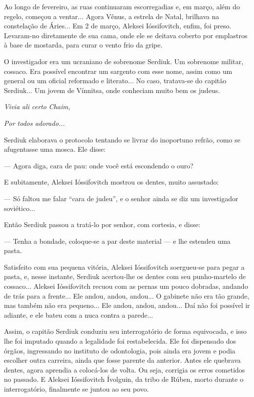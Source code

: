 Ao longo de fevereiro, as ruas continuaram escorregadias e, em março,
além do regelo, começou a ventar... Agora Vênus, a estrela de Natal,
brilhava na constelação de Áries... Em 2 de março, Aleksei Ióssifovitch,
enfim, foi preso. Levaram-no diretamente de sua cama, onde ele se
deitava coberto por emplastros à base de mostarda, para curar o vento
frio da gripe.

O investigador era um ucraniano de sobrenome Serdiuk. Um sobrenome
militar, cossaco. Era possível encontrar um sargento com esse nome,
assim como um general ou um oficial reformado e literato... No caso,
tratava-se do capitão Serdiuk... Um jovem de Vínnitsa, onde conheciam
muito bem os judeus.

\emph{Vivia ali certo} \emph{Chaim, }

\emph{Por todos adorado...}

Serdiuk elaborava o protocolo tentando se livrar do inoportuno refrão,
como se afugentasse uma mosca. Ele disse:

--- Agora diga, cara de pau: onde você está escondendo o ouro?

E subitamente, Aleksei Ióssifovitch mostrou os dentes, muito assustado:

--- Só faltou me falar ``cara de judeu'', e o senhor ainda se diz um
investigador soviético...

Então Serdiuk passou a tratá-lo por senhor, com cortesia, e disse:

--- Tenha a bondade, coloque-se a par deste material --- e lhe estendeu
uma pasta.

Satisfeito com sua pequena vitória, Aleksei Ióssifovitch soergueu-se
para pegar a pasta, e, nesse instante, Serdiuk acertou-lhe os dentes com
seu punho-martelo de cossaco... Aleksei Ióssifovitch recuou com as
pernas um pouco dobradas, andando de trás para a frente... Ele andou,
andou, andou... O gabinete não era tão grande, mas também não era
pequeno... Ele andou, andou, andou... Daí não foi possível ir adiante, e
ele bateu com a nuca contra a parede...

Assim, o capitão Serdiuk conduziu seu interrogatório de forma
equivocada, e isso lhe foi imputado quando a legalidade foi
restabelecida. Ele foi dispensado dos órgãos, ingressando no instituto
de odontologia, pois ainda era jovem e podia escolher outra carreira,
ainda que fosse parente da anterior. Antes ele quebrava dentes, agora
aprendia a colocá-los de volta. Ou seja, corrigia os erros cometidos no
passado. E Aleksei Ióssifovitch Ívolguin, da tribo de Rúben, morto
durante o interrogatório, finalmente se juntou ao seu povo.

